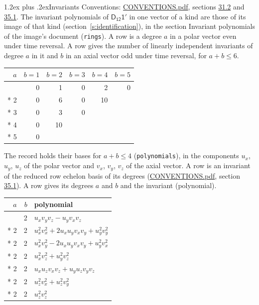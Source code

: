 \documentclass[10pt,a4paper]{article}
\makeatletter
\renewcommand\section{\@startsection{section}{1}{\z@}{-3ex plus -1ex minus -.2ex}%
  {1.2ex plus .2ex}{\normalfont\large\sffamily\bfseries\color{parttitle}}}
\numberwithin{equation}{section}
\newcommand{\grp}[1]{\mathsf{#1}}
\makeatother
\begin{document}
\section{Invariants}\label{s:invariants}
Conventions: \href{../../CONVENTIONS.pdf}{CONVENTIONS.pdf}, sections \href{../../CONVENTIONS.pdf\#conv.31.2}{31.2} and \href{../../CONVENTIONS.pdf\#conv.35.1}{35.1}.
The invariant polynomials of $\grp{D_{12}1'}$ in one vector of a kind are those of its image of that kind (section~\ref{s:identification}), in the section Invariant polynomials of the image's document (\texttt{rings}).
\leavevmode\label{n:index.degree.polar}\label{n:index.degree.axial}A row is a degree $a$ in a polar vector even under time reversal. A row gives the number of linearly independent invariants of degree $a$ in it and $b$ in an axial vector odd under time reversal, for $a + b \le 6$.
{\small\begin{longtable}{@{}rrrrrr@{}}\toprule
$a$ & $b = 1$ & $b = 2$ & $b = 3$ & $b = 4$ & $b = 5$\\\midrule\endhead
\bottomrule\endfoot\endlastfoot
1 & 0 & 1 & 0 & 2 & 0\\*
2 & 0 & 6 & 0 & 10 & \\*
3 & 0 & 3 & 0 &  & \\*
4 & 0 & 10 &  &  & \\*
5 & 0 &  &  &  & \\
\bottomrule\end{longtable}}
\leavevmode\label{n:local.component.polar}\label{n:local.component.axial}The record holds their bases for $a + b \le 4$ (\texttt{polynomials}), in the components $u_{x}$, $u_{y}$, $u_{z}$ of the polar vector and $v_{x}$, $v_{y}$, $v_{z}$ of the axial vector. \label{n:head.polynomial}A row is an invariant of the reduced row echelon basis of its degrees (\href{../../CONVENTIONS.pdf}{CONVENTIONS.pdf}, section \href{../../CONVENTIONS.pdf\#conv.35.1}{35.1}). A row gives its degrees $a$ and $b$ and the invariant (polynomial).
{\small\renewcommand{\arraystretch}{1.2}\begin{longtable}{@{}rrl@{}}\toprule
$a$ & $b$ & polynomial\\\midrule\endhead
\bottomrule\endfoot\endlastfoot
1 & 2 & $u_{x}v_{y}v_{z} - u_{y}v_{x}v_{z}$\\*
2 & 2 & $u_{x}^{2}v_{x}^{2} + 2u_{x}u_{y}v_{x}v_{y} + u_{y}^{2}v_{y}^{2}$\\*
2 & 2 & $u_{x}^{2}v_{y}^{2} - 2u_{x}u_{y}v_{x}v_{y} + u_{y}^{2}v_{x}^{2}$\\*
2 & 2 & $u_{x}^{2}v_{z}^{2} + u_{y}^{2}v_{z}^{2}$\\*
2 & 2 & $u_{x}u_{z}v_{x}v_{z} + u_{y}u_{z}v_{y}v_{z}$\\*
2 & 2 & $u_{z}^{2}v_{x}^{2} + u_{z}^{2}v_{y}^{2}$\\*
2 & 2 & $u_{z}^{2}v_{z}^{2}$\\
\bottomrule\end{longtable}}
\end{document}
